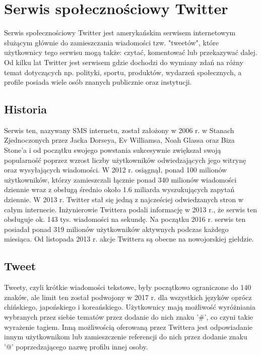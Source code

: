\chapter{Serwis społecznościowy Twitter}
Serwis spo\l{}eczno\'sciowy Twitter jest ameryka\'nskim serwisem internetowym s\l{}u\.z\k{a}cym g\l{}\'ownie do zamieszczania wiadomo\'sci tzw. "tweet\'ow", kt\'ore u\.zytkownicy tego serwisu mog\k{a} także: czytać, komentowa\'c lub przekazywa\'c dalej. Od kilku lat Twitter jest serwisem gdzie dochodzi do wymiany zdań na różny temat dotyczących np. polityki, sportu, produktów, wydarzeń społecznych, a profile posiada wiele osób znanych publicznie oraz instytucji.

\section{Historia}
Serwis ten, nazywany SMS internetu, zosta\l{} za\l{}o\.zony w 2006 r. w Stanach Zjednoczonych przez Jacka Dorseya, Ev Williamsa, Noah Glassa oraz Biza Stone’a i od początku swojego powstania sukcesywnie zwi\k{e}ksza\l{} swoj\k{a} popularno\'s\'c poprzez wzrost liczby u\.zytkownik\'ow odwiedzaj\k{a}cych jego witryn\k{e} oraz wysy\l{}aj\k{a}cych wiadomo\'sci. W 2012 r. osiągnął‚ ponad 100 milionów użytkowników, którzy zamieszczali łącznie ponad 340 milionów wiadomo\'sci dziennie wraz z obsługą \'srednio około 1.6 miliarda wyszukujących zapytań dziennie. W 2013 r. Twitter stał si\k{e} jedną z najcze\'sciej odwiedzanych stron w całym internecie. Inżynierowie Twittera podali informację w 2013 r., że serwis ten obsługuje ok. 143 tys. wiadomości na sekundę. Na początku 2016 r. serwis ten posiadał ponad 319 milionów użytkowników aktywnych podczas każdego miesiąca. Od listopada 2013 r. akcje Twittera są obecne na nowojorskiej giełdzie.

\section{Tweet}
Tweety, czyli krótkie wiadomości tekstowe, by\l{}y pocz\k{a}tkowo ograniczone do 140 znak\'ow, ale limit ten zosta\l{} podwojony w 2017 r. dla wszystkich j\k{e}zyk\'ow opr\'ocz chi\'nskiego, japo\'nskiego i korea\'nskiego. Użytkownicy mają możliwość wyróżniania wybranych przez siebie tematów przez dodanie do nich znaku '\#', co czyni takie wyrażenie tagiem. Inną możliwością oferowaną przez Twittera jest odpowiadanie innym użytkownikom lub zamieszczenie referencji do nich przez dodanie znaku '@' poprzedzającego nazwę profilu innej osoby.

